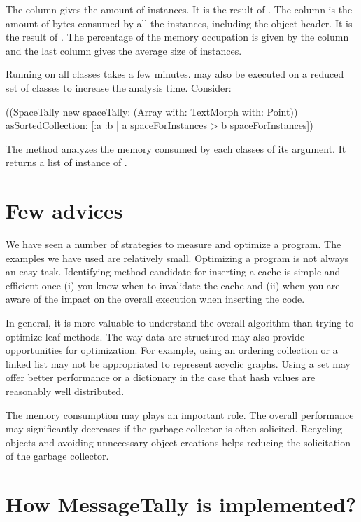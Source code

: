 \documentclass[a4paper,10pt,twoside]{book}
\begin{document}
The  column gives the amount of instances. It is the result of . 
The  column is the amount of bytes consumed by all the instances, including the object header. It is the result of .
The percentage of the memory occupation is given by the column  and the last column gives the average size of instances.

Running  on all classes takes a few minutes.  may also be executed on a reduced set of classes to increase the analysis time. Consider:


\begin{code}{}
((SpaceTally new spaceTally: (Array with: TextMorph with: Point)) 
	asSortedCollection: [:a :b | a spaceForInstances > b spaceForInstances]) 
\end{code}

The method  analyzes the memory consumed by each classes of its argument. It returns a list of instance of .

\section{Few advices}

We have seen a number of strategies to measure and optimize a program. The examples we have used are relatively small. Optimizing a program is not always an easy task. Identifying method candidate for inserting a cache is simple and efficient once (i) you know when to invalidate the cache and (ii) when you are aware of the impact on the overall execution when inserting the code.

In general, it is more valuable to understand the overall algorithm than trying to optimize leaf methods. The way data are structured may also provide opportunities for optimization. For example, using an ordering collection or a linked list may not be appropriated to represent acyclic graphs. Using a set may offer better performance or a dictionary in the case that hash values are reasonably well distributed.

The memory consumption may plays an important role. The overall performance may significantly decreases if the garbage collector is often solicited. Recycling objects and avoiding unnecessary object creations helps reducing the solicitation of the garbage collector.

\section {How MessageTally is implemented?}
\end{document}
